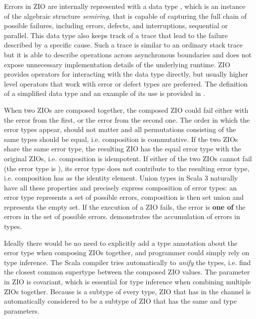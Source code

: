 Errors in ZIO are internally represented with a data type , which is an instance of the algebraic structure \emph{semiring}, that is capable of capturing the full chain of possible failures, including errors, defects, and interruptions, sequential or parallel. This data type also keeps track of a trace that lead to the failure described by a specific cause. Such a trace is similar to an ordinary stack trace but it is able to describe operations across asynchronous boundaries and does not expose unnecessary implementation details of the underlying runtime. ZIO provides operators for interacting with the  data type directly, but usually higher level operators that work with error or defect types are preferred. The definition of a simplified  data type and an example of its use is provided in .



When two ZIOs are composed together, the composed ZIO could fail either with the error from the first, or the error from the second one. The order in which the error types appear, should not matter and all permutations consisting of the same types should be equal, i.e. composition is commutative. If the two ZIOs share the same error type, the resulting ZIO has the equal error type with the original ZIOs, i.e. composition is idempotent. If either of the two ZIOs cannot fail (the error type is ), its error type does not contribute to the resulting error type, i.e. composition has  as the identity element. Union types in Scala 3 naturally have all these properties and precisely express composition of error types: an error type represents a set of possible errors, composition is then set union and  represents the empty set. If the execution of a ZIO fails, the error is \textbf{one of} the errors in the set of possible errors.  demonstrates the accumulation of errors in types.



Ideally there would be no need to explicitly add a type annotation about the error type when composing ZIOs together, and programmer could simply rely on type inference. The Scala compiler tries automatically to \emph{unify} the types, i.e. find the closest common supertype between the composed ZIO values. The  parameter in ZIO is covariant, which is essential for type inference when combining multiple ZIOs together. Because  is a subtype of every type, ZIO that has  in the  channel is automatically considered to be a subtype of ZIO that has the same  and  type parameters.

